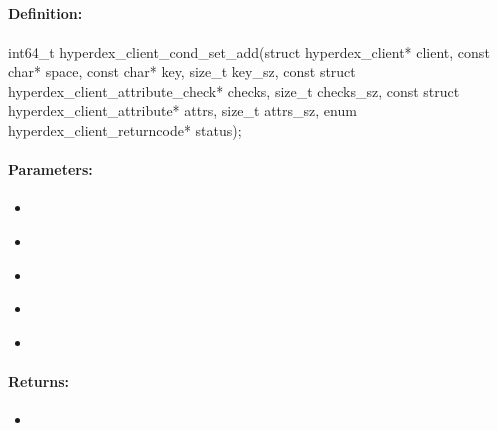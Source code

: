 \pagebreak
\subsection{}
\label{api:c:cond_set_add}


\paragraph{Definition:}
\begin{ccode}
int64_t hyperdex_client_cond_set_add(struct hyperdex_client* client,
        const char* space,
        const char* key, size_t key_sz,
        const struct hyperdex_client_attribute_check* checks, size_t checks_sz,
        const struct hyperdex_client_attribute* attrs, size_t attrs_sz,
        enum hyperdex_client_returncode* status);
\end{ccode}

\paragraph{Parameters:}
\begin{itemize}[noitemsep]
\item {}\\

\item {}\\

\item {}\\

\item {}\\

\item {}\\

\end{itemize}

\paragraph{Returns:}
\begin{itemize}[noitemsep]
\item {}\\

\end{itemize}


